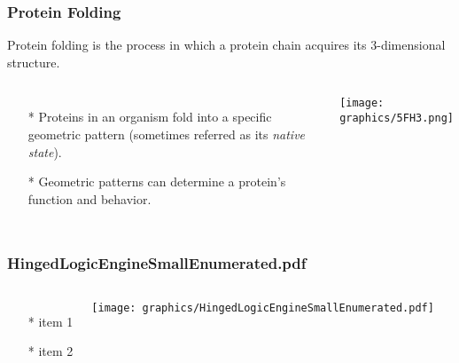 \documentclass{beamer}
\begin{document}
\begin{frame}
  \frametitle{Protein Folding}
  Protein folding is the process in which a protein chain acquires its 3-dimensional structure.
  \begin{columns}[c] %
   \begin{itemize}
    \item[*] Proteins in an organism fold into a specific geometric pattern (sometimes referred as its \textit{native state}).
    \item[*]  Geometric patterns can determine a protein's function and behavior. 
   \end{itemize}
     \begin{minipage}{\linewidth}
    \begin{center}
    \texttt{[image: graphics/5FH3.png]}
    \end{center}
  \end{minipage}
  \end{columns}
\end{frame}

\begin{frame} \frametitle{HingedLogicEngineSmallEnumerated.pdf}
    \begin{columns}[c]
        \begin{itemize}
            \item[*] item 1
            \item[*] item 2
        \end{itemize}
        \begin{minipage}{\linewidth}
            \begin{center}
            \texttt{[image: graphics/HingedLogicEngineSmallEnumerated.pdf]}
            \label{gfx:HingedLogicEngineSmallEnumerated.pdf}
            \end{center}
        \end{minipage}
    \end{columns}
\end{frame}
\end{document}
